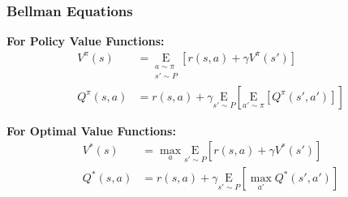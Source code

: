 \begin{frame}
    \frametitle{Bellman Equations}
    
    \textbf{For Policy Value Functions:}
    \begin{align*}
        V^{\pi}(s) &= \underset{\substack{a \sim \pi \\ s'\sim P}}{\mathrm{E}} 
        \left[ r(s,a) + \gamma V^{\pi}(s') \right] \\
        Q^{\pi}(s,a) &= r(s,a) + \gamma \underset{s'\sim P}{\mathrm{E}} 
        \left[ \underset{a'\sim \pi}{\mathrm{E}} \left[ Q^{\pi}(s',a') \right] \right]
    \end{align*}
    
    \vspace{0.3cm}
    \textbf{For Optimal Value Functions:}
    \begin{align*}
        V^{*}(s) &= \max_a \underset{s'\sim P}{\mathrm{E}} \left[ r(s,a) + \gamma V^{*}(s') \right] \\
        Q^{*}(s,a) &= r(s,a) + \gamma \underset{s'\sim P}{\mathrm{E}} \left[ \max_{a'} Q^{*}(s',a') \right]
    \end{align*}
\end{frame}

